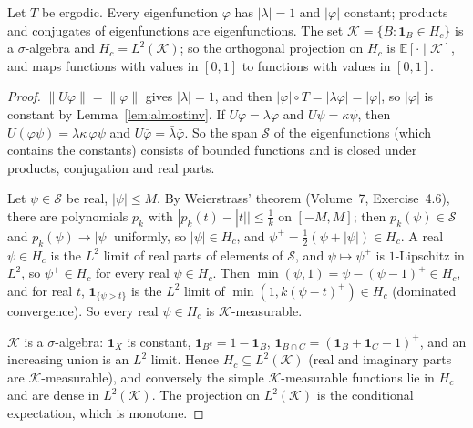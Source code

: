 \begin{lemma}\label{lem:compactpart}
Let $T$ be ergodic. Every eigenfunction $\varphi$ has $|\lambda|=1$ and $|\varphi|$ constant; products and conjugates of eigenfunctions are eigenfunctions. The set $\mathcal K=\{B:\mathbf 1_B\in H_c\}$ is a $\sigma$-algebra and $H_c=L^2(\mathcal K)$;
so the orthogonal projection on $H_c$ is $\mathbb E[\cdot\mid\mathcal K]$, and maps functions with values in $[0,1]$ to functions with values in $[0,1]$.
\end{lemma}
\begin{proof}
$\|U\varphi\|=\|\varphi\|$ gives $|\lambda|=1$, and then $|\varphi|\circ T=|\lambda\varphi|=|\varphi|$, so $|\varphi|$ is constant by Lemma~\ref{lem:almostinv}. If $U\varphi=\lambda\varphi$ and $U\psi=\kappa\psi$, then
$U(\varphi\psi)=\lambda\kappa\,\varphi\psi$ and $U\bar\varphi=\bar\lambda\bar\varphi$. So the span $\mathcal S$ of the eigenfunctions (which contains the constants) consists of bounded functions and is closed under products, conjugation and real parts.

Let $\psi\in\mathcal S$ be real, $|\psi|\le M$. By Weierstrass' theorem (Volume~7, Exercise~4.6), there are polynomials $p_k$ with $|p_k(t)-|t||\le\frac1k$ on $[-M,M]$; then $p_k(\psi)\in\mathcal S$ and $p_k(\psi)\to|\psi|$ uniformly, so
$|\psi|\in H_c$, and $\psi^+=\frac12(\psi+|\psi|)\in H_c$. A real $\psi\in H_c$ is the $L^2$ limit of real parts of elements of $\mathcal S$, and $\psi\mapsto\psi^+$ is $1$-Lipschitz in $L^2$, so $\psi^+\in H_c$ for every real $\psi\in H_c$.
Then $\min(\psi,1)=\psi-(\psi-1)^+\in H_c$, and for real $t$, $\mathbf 1_{\{\psi>t\}}$ is the $L^2$ limit of $\min(1,k(\psi-t)^+)\in H_c$ (dominated convergence). So every real $\psi\in H_c$ is $\mathcal K$-measurable.

$\mathcal K$ is a $\sigma$-algebra: $\mathbf 1_X$ is constant, $\mathbf 1_{B^c}=1-\mathbf 1_B$, $\mathbf 1_{B\cap C}=(\mathbf 1_B+\mathbf 1_C-1)^+$, and an increasing union is an $L^2$ limit. Hence $H_c\subseteq L^2(\mathcal K)$ (real and imaginary parts are $\mathcal K$-measurable), and
conversely the simple $\mathcal K$-measurable functions lie in $H_c$ and are dense in $L^2(\mathcal K)$. The projection on $L^2(\mathcal K)$ is the conditional expectation, which is monotone.
\end{proof}

